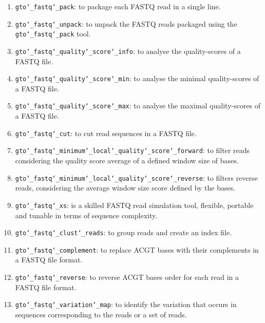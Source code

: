 \begin{enumerate}
\item \texttt{gto\char`_fastq\char`_pack}: to package each FASTQ read in a single line.

\item \texttt{gto\char`_fastq\char`_unpack}: to unpack the FASTQ reads packaged using the \texttt{gto\char`_fastq\char`_pack} tool.

\item \texttt{gto\char`_fastq\char`_quality\char`_score\char`_info}: to analyse the quality-scores of a FASTQ file.

\item \texttt{gto\char`_fastq\char`_quality\char`_score\char`_min}: to analyse the minimal quality-scores of a FASTQ file.

\item \texttt{gto\char`_fastq\char`_quality\char`_score\char`_max}: to analyse the maximal quality-scores of a FASTQ file.

\item \texttt{gto\char`_fastq\char`_cut}: to cut read sequences in a FASTQ file. 

\item \texttt{gto\char`_fastq\char`_minimum\char`_local\char`_quality\char`_score\char`_forward}: to filter reads considering the quality score average of a defined window size of bases.

\item \texttt{gto\char`_fastq\char`_minimum\char`_local\char`_quality\char`_score\char`_reverse}: to filters reverse reads, considering the average window size score defined by the bases.

\item \texttt{gto\char`_fastq\char`_xs}: is a skilled FASTQ read simulation tool, flexible, portable and tunable in terms of sequence complexity.

\item \texttt{gto\char`_fastq\char`_clust\char`_reads}: to group reads and create an index file.

\item \texttt{gto\char`_fastq\char`_complement}: to replace ACGT bases with their complements in a FASTQ file format.

\item \texttt{gto\char`_fastq\char`_reverse}: to reverse ACGT bases order for each read in a FASTQ file format.

\item \texttt{gto\char`_fastq\char`_variation\char`_map}: to identify the variation that occurs in sequences corresponding to the reads or a set of reads.


\end{enumerate}

